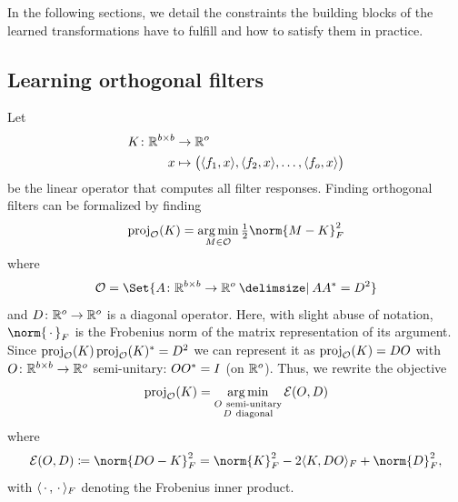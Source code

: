 In the following sections, we detail the constraints the building blocks of the learned transformations have to fulfill and how to satisfy them in practice.
\subsection{Learning orthogonal filters}%
\label{sssec:orthogonal filters}
Let
\begin{equation}
	\begin{aligned}
		K \colon \mathbb{R}^{b\times b}& \to \mathbb{R}^o \\
		x &\mapsto \bigl( \langle f_{\num{1}}, x \rangle, \langle f_{\num{2}}, x \rangle, \dotsc, \langle f_o, x \rangle \bigr)
	\end{aligned}
	\label{eq:linear operator of filters}
\end{equation}
be the linear operator that computes all filter responses.
Finding orthogonal filters can be formalized by finding
\begin{equation}
	\proj_{\mathcal{O}}(K) = \argmin_{M \in \mathcal{O}} \Half \norm{M - K}_F^{\num{2}}
\end{equation}
where
\begin{equation}
	\mathcal{O} = \Set{\map{A}{\R^{b\times b}}{\R^\NumExperts} \given A\Adjoint{A} = D^{\num{2}}}
	\label{eq:ortho set}
\end{equation}
and \( D \colon \mathbb{R}^o \to \mathbb{R}^o \) is a diagonal operator.
Here, with slight abuse of notation, \( \norm{\argm}_F \) is the Frobenius norm of the matrix representation of its argument.
Since \( \operatorname{proj}_{\mathcal{O}}(K) \operatorname{proj}_{\mathcal{O}}(K)^{\ast} = D^{\num{2}} \) we can represent it as \( \operatorname{proj}_{\mathcal{O}}(K) = DO \) with \( O \colon \mathbb{R}^{b\times b} \to \mathbb{R}^o \) semi-unitary: \( OO^{\ast} = I \) (on \( \mathbb{R}^o \)).
Thus, we rewrite the objective
\begin{equation}
	\operatorname{proj}_{\mathcal{O}}(K) = \operatorname*{arg\,min}_{\substack{O\ \text{semi-unitary} \\ D\ \text{diagonal} }} \mathcal{E}(O, D)
\end{equation}
where
\begin{equation}
	\mathcal{E}(O, D) \coloneqq \norm{DO - K}_F^{\num{2}}  = \norm{K}_F^{\num{2}} - \num{2} \langle K, DO \rangle_F + \norm{D}_F^{\num{2}},
\end{equation}
with \( \langle \,\cdot\,, \,\cdot\, \rangle_F \) denoting the Frobenius inner product.

